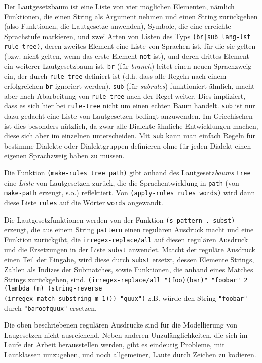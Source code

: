 \documentclass[12pt,a4paper,normalheadings]{scrartcl}
\def\tt#1{\texttt{#1}}
\begin{document}
Der Lautgesetzbaum ist eine Liste von vier möglichen Elementen, nämlich
Funktionen, die einen String als Argument nehmen und einen String zurückgeben
(also Funktionen, die Lautgesetze anwenden),
Symbole, die eine erreichte Sprachstufe markieren,
und zwei Arten von Listen des Typs \tt{(br|sub lang-lst rule-tree)},
deren zweites Element eine Liste von Sprachen ist,
für die sie gelten (bzw. nicht gelten, wenn das erste Element \tt{not} ist),
und deren drittes Element ein weiterer Lautgesetzbaum ist.
\tt{br} (für \emph{branch}) leitet einen neuen Sprachzweig ein,
der durch \tt{rule-tree} definiert ist
(d.h. dass alle Regeln nach einem erfolgreichen \tt{br} ignoriert werden).
\tt{sub} (für \emph{subrules}) funktioniert ähnlich,
macht aber nach Abarbeitung von \tt{rule-tree}
nach der Regel weiter.
Dies impliziert,
dass es sich hier bei \tt{rule-tree} nicht um einen echten Baum handelt.
\tt{sub} ist nur dazu gedacht eine Liste von Lautgesetzen bedingt anzuwenden.
Im Griechischen ist dies besonders nützlich,
da zwar alle Dialekte ähnliche Entwicklungen machen,
diese sich aber im einzelnen unterscheiden.
Mit \tt{sub} kann man einfach Regeln für bestimme Dialekte oder
Dialektgruppen definieren ohne für jeden Dialekt einen eigenen Sprachzweig
haben zu müssen.

Die Funktion \tt{(make-rules tree path)}
gibt anhand des Lautgesetz\emph{baums} \tt{tree} eine \emph{Liste}
von Lautgesetzen zurück,
die die Sprachentwicklung in \tt{path} (von \tt{make-path} erzeugt, s.o.)
reflektiert.
Von \tt{(apply-rules rules words)} wird dann diese Liste \tt{rules}
auf die Wörter \tt{words} angewandt.

Die Lautgesetzfunktionen werden von der Funktion \tt{(s pattern . subst)}
erzeugt,
die aus einem String \tt{pattern} einen regulären Ausdruck macht
und eine Funktion zurückgibt,
die \tt{irregex-replace/all} auf diesen regulären Ausdruck
und die Ersetzungen in der Liste \tt{subst} anwendet.
Matcht der reguläre Ausdruck einen Teil der Eingabe,
wird diese durch \tt{subst} ersetzt,
dessen Elemente Strings, Zahlen als Indizes der Submatches, sowie
Funktionen, die anhand eines Matches Strings zurückgeben, sind.
\tt{(irregex-replace/all "(foo)(bar)" "foobar" 2 (lambda (m)
    (string-reverse\\ (irregex-match-substring m 1))) "quux")}
z.B. würde den String \tt{"foobar"} durch \tt{"baroofquux"} ersetzen.

Die oben beschriebenen regulären Ausdrücke
sind für die Modellierung von Laugesetzen nicht ausreichend.
Neben anderen Unzulänglichkeiten,
die sich im Laufe der Arbeit herausstellen werden,
gibt es eindeutig Probleme, mit Lautklassen umzugehen,
und noch allgemeiner, Laute durch Zeichen zu kodieren.
\end{document}
